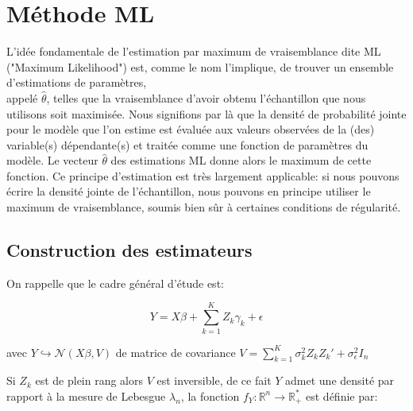 \documentclass[12pt,fleqn]{book} %
\begin{document}
\newpage


   

\chapter{Méthode ML}


\vspace{1em}

L’idée fondamentale de l’estimation par maximum de vraisemblance dite ML ("Maximum Likelihood") est, comme le nom l’implique, de trouver un ensemble d’estimations de paramètres,\\ 
appelé $\hat{\theta}$, telles que la vraisemblance d’avoir obtenu l’échantillon que nous utilisons soit maximisée. Nous signifions par là que la densité de probabilité jointe pour le modèle que l’on estime est évaluée aux valeurs observées de la (des) variable(s) dépendante(s) et traitée comme une fonction de paramètres du modèle. Le vecteur $\hat{\theta}$ des estimations ML donne alors
le maximum de cette fonction. Ce principe d’estimation est très largement applicable: si nous pouvons écrire la densité jointe de l’échantillon, nous pouvons en principe utiliser le maximum de vraisemblance, soumis bien sûr à certaines conditions de régularité. 

\vspace{1em}

\section{Construction des estimateurs}

\vspace{1em}

On rappelle que le cadre général d'étude est: 

\begin{equation*} 
Y=X\beta+\sum_{k=1}^{K} Z_k \gamma_k+\epsilon 
\end{equation*}

avec \: $ Y\hookrightarrow\mathcal{N}(X\beta,V)$ \:de matrice de covariance $V=\sum_{k=1}^{K} \sigma_k^2 Z_k  Z_k'+\sigma_{\epsilon}^2 I_{n}$

  \vspace{1em}
 Si $Z_k$ est de plein rang alors $V$ est inversible, de ce fait $Y$ admet une densité par rapport à la mesure de Lebesgue $\lambda_{n}$, la fonction $f_{Y} : \mathbb{R}^{n} \rightarrow \mathbb{R}_{+}^{*}$ est définie par:
\end{document}
